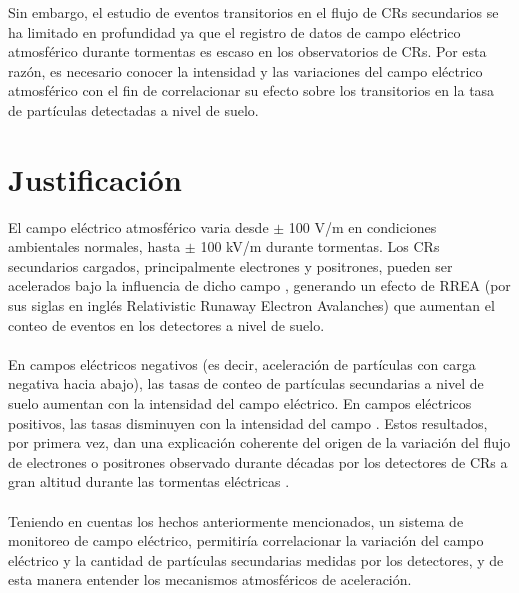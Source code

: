 \documentclass[12pt,a4paper,oneside]{book}
\begin{document}
Sin embargo, el estudio de eventos transitorios en el flujo de CRs secundarios se ha limitado en profundidad ya que el registro de datos de campo eléctrico atmosférico durante tormentas es escaso en los observatorios de CRs. Por esta razón, es necesario conocer la intensidad y las variaciones del campo eléctrico atmosférico con el fin de correlacionar su efecto sobre los transitorios en la tasa de partículas detectadas a nivel de suelo.


 
\newpage 
\chapter{Justificación}
El campo eléctrico atmosférico varia desde $\pm$ 100 V/m en condiciones ambientales normales, hasta $\pm$ 100 kV/m durante tormentas. Los CRs secundarios cargados, principalmente electrones y positrones, pueden ser acelerados bajo la influencia de dicho campo \cite{macgorman1998electrical,marshall2005observed}, generando un efecto de RREA (por sus siglas en inglés Relativistic Runaway Electron Avalanches) \cite{dwyer2011low} que aumentan el conteo de eventos en los detectores a nivel de suelo.\\\\
En campos eléctricos negativos (es decir, aceleración de partículas con carga negativa hacia abajo), las tasas de conteo de partículas secundarias a nivel de suelo aumentan con la intensidad del campo eléctrico. En campos eléctricos positivos, las tasas disminuyen con la intensidad del campo \cite{dorman2013cosmic}. Estos resultados, por primera vez, dan una explicación coherente del origen de la variación del flujo de electrones o positrones observado durante décadas por los detectores de CRs a gran altitud durante las tormentas eléctricas \cite{Marteau-etal2012}.\\\\
Teniendo en cuentas los hechos anteriormente mencionados, un sistema de monitoreo de campo eléctrico, permitiría correlacionar la variación del campo eléctrico y la cantidad de partículas secundarias medidas por los detectores, y de esta manera entender los mecanismos atmosféricos de aceleración. 
\end{document}
